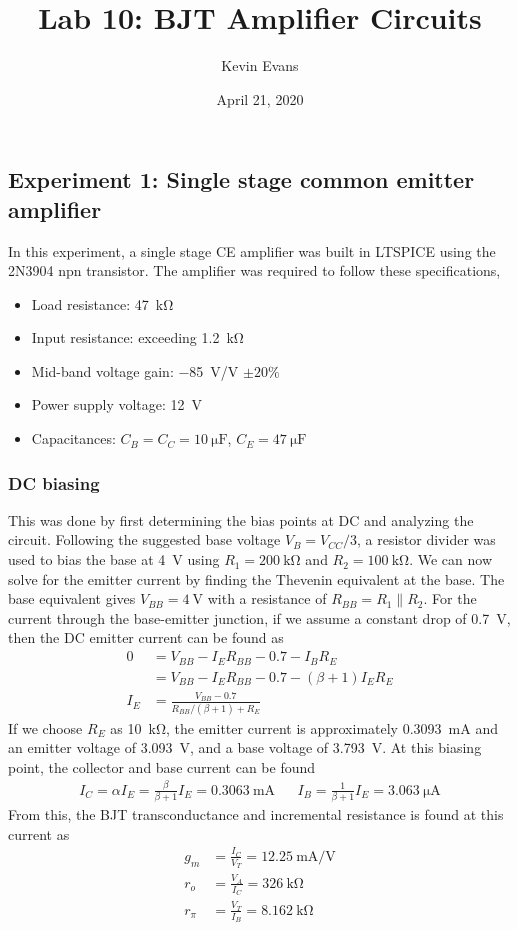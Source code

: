 \documentclass{homework}
\title{Lab 10: BJT Amplifier Circuits}
\author{Kevin Evans}
\date{April 21, 2020}
\begin{document}
	\maketitle
	\subsection*{Experiment 1: Single stage common emitter amplifier}
	In this experiment, a single stage CE amplifier was built in LTSPICE using the 2N3904 npn transistor. The amplifier was required to follow these specifications, \begin{itemize}
		\item Load resistance: \SI{47}{\kohm}
		\item Input resistance: exceeding \SI{1.2}{\kohm}
		\item Mid-band voltage gain: \SI{-85}{\V/\V} $\pm 20\%$
		\item Power supply voltage: \SI{12}{\V}
		\item Capacitances: $C_B = C_C = \SI{10}{\micro\farad}$, $C_E = \SI{47}{\micro\farad}$
	\end{itemize}

	\subsubsection*{DC biasing}
	This was done by first determining the bias points at DC and analyzing the circuit. Following the suggested base voltage $V_B = V_{CC} / 3$, a resistor divider was used to bias the base at \SI{4}{\V} using $R_1 = \SI{200}{\kohm}$ and $R_2 = \SI{100}{\kohm}$. %
	We can now solve for the emitter current by finding the Thevenin equivalent at the base. The base equivalent gives $V_{BB} = \SI{4}{\V}$ with a resistance of $R_{BB} = R_1 \parallel R_2$. For the current through the base-emitter junction, if we assume a constant drop of \SI{0.7}{\V}, then the DC emitter current can be found as  \begin{align*}
		0 & = V_{BB} - I_E R_{BB} - 0.7 - I_B R_E \\
			& = V_{BB} - I_E R_{BB} - 0.7 - \left(\beta + 1\right) I_E R_E \\
		I_E & = \frac{V_{BB} - 0.7}{R_{BB} / (\beta + 1) + R_E}
	\end{align*}
	If we choose $R_E$ as \SI{10}{\kohm}, the emitter current is approximately \SI{0.3093}{\mA} and an emitter voltage of \SI{3.093}{\V}, and a base voltage of \SI{3.793}{\V}. At this biasing point, the collector and base current can be found
	\begin{align*}
	I_C = \alpha I_E = \frac{\beta}{\beta + 1} I_E = \SI{0.3063}{\mA} && I_B = \frac{1}{\beta + 1}I_E = \SI{3.063}{\micro\ampere}
	\end{align*}
	From this, the BJT transconductance and incremental resistance is found at this current as \begin{align*}
		g_m & = \frac{I_C}{V_T} = \SI{12.25}{\mA/\V} \\
		r_o & = \frac{V_A}{I_C} = \SI{326}{\kohm} \\
		r_\pi & = \frac{V_T}{I_B} = \SI{8.162}{\kohm}
	\end{align*}
\end{document}
